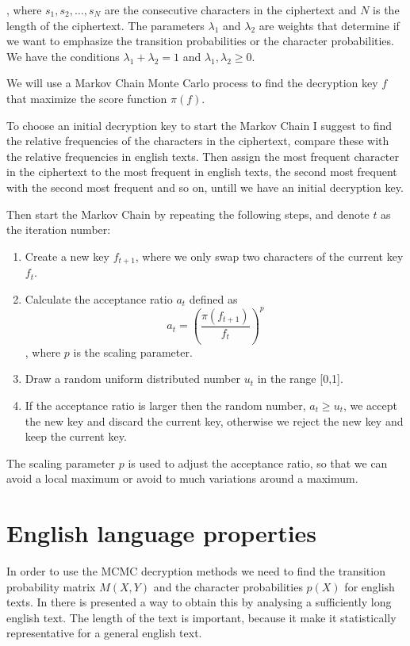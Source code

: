 \documentclass[a4paper, 11pt]{article}
\begin{document}
, where $s_1,s_2,\dots,s_N$ are the consecutive characters in the ciphertext
and $N$ is the length of the ciphertext. The parameters $\lambda_1$ and 
$\lambda_2$ are weights that determine if we want to emphasize the
transition probabilities or the character probabilities. We have the conditions
$\lambda_1 + \lambda_2 = 1$ and $\lambda_1, \lambda_2 \geq 0$.

We will use a Markov Chain Monte Carlo process to find the decryption key
$f$ that maximize the score function $\pi(f)$.

To choose an initial decryption key to start the Markov Chain I suggest to
find the relative frequencies of the characters in the ciphertext, compare 
these with the relative frequencies in english texts. Then assign the most
frequent character in the ciphertext to the most frequent in english texts, 
the second most frequent with the second most frequent and so on, untill
we have an initial decryption key.

Then start the Markov Chain by repeating the following steps, and denote
$t$ as the iteration number:

\begin{enumerate}
  \item Create a new key $f_{t+1}$, where we only swap two characters of 
  the current key $f_t$.

  \item Calculate the acceptance ratio $a_t$ defined as
  \[
    a_t = \left( \frac{\pi(f_{t+1})}{f_{t}} \right)^p
  \]
  , where $p$ is the scaling parameter.

  \item Draw a random uniform distributed number $u_t$ in the range [0,1].

  \item If the acceptance ratio is larger then the random number, 
  $a_t \geq u_t$, we accept the new key and discard the current key, 
  otherwise we reject the new key and keep the current key.
\end{enumerate}

The scaling parameter $p$ is used to adjust the acceptance ratio, so that
we can avoid a local maximum or avoid to much variations around a maximum.

\section{English language properties}

In order to use the MCMC decryption methods we need to find the transition
probability matrix $M(X,Y)$ and the character probabilities $p(X)$ for
english texts. In \cite{Landgraf} there is presented a way to obtain this by
analysing a sufficiently long english text. The length of the text is
important, because it make it statistically representative for a general
english text. 
\end{document}
